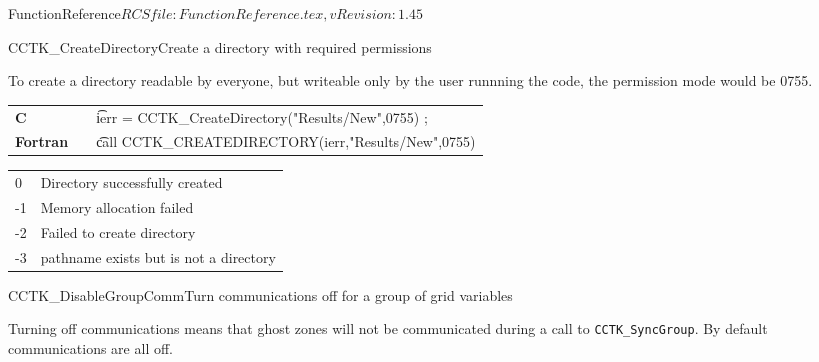 \begin{cactuspart}{5}{FunctionReference}{$RCSfile: FunctionReference.tex,v $}{$Revision: 1.45 $}
\begin{CCTKFunc}{CCTK\_CreateDirectory}{Create a directory with required permissions}
\label{CCTK-CreateDirectory}
\showargs
\begin{params}
\end{params}
\begin{discussion}
To create a directory readable by everyone, but writeable only by the user runnning the code, the permission mode would be 0755.
\end{discussion}
\begin{examples}
\begin{tabular}{@{}p{3cm}cp{11cm}}
\hfill {\bf C} && {\t ierr = CCTK\_CreateDirectory("Results/New",0755) };
\\
\hfill {\bf Fortran} && {\t call CCTK\_CREATEDIRECTORY(ierr,"Results/New",0755)}
\\
\end{tabular}
\end{examples}
\begin{errorcodes}
\begin{tabular}{ll}
0 & Directory successfully created\\
-1 & Memory allocation failed\\
-2 & Failed to create directory\\
-3 & pathname exists but is not a directory\\
\end{tabular}
\end{errorcodes}
\end{CCTKFunc}




\begin{CCTKFunc}{CCTK\_DisableGroupComm}{Turn communications off for a group of grid variables}
\label{CCTK-DisableGroupComm}
\showcargs
\begin{params}
\end{params}
\begin{discussion}
Turning off communications means that ghost zones will not be
communicated during a call to {\tt CCTK\_SyncGroup}. By default
communications are all off.
\end{discussion}
\begin{examples}
\begin{tabular}{@{}p{3cm}cp{11cm}}
\end{tabular}
\end{examples}
\begin{errorcodes}
\end{errorcodes}
\end{CCTKFunc}




\end{cactuspart}
